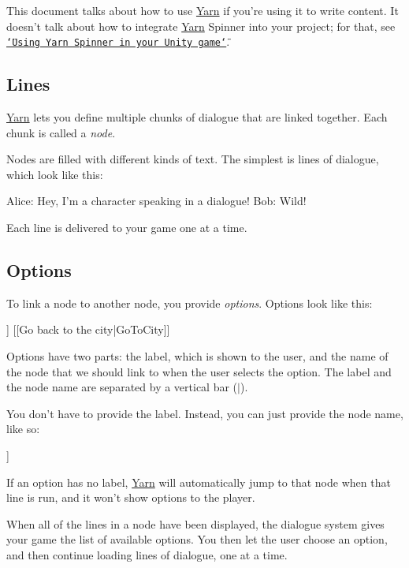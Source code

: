 This document talks about how to use \hyperlink{a00045}{Yarn} if you're using it to write content. It doesn't talk about how to integrate \hyperlink{a00045}{Yarn} Spinner into your project; for that, see \href{../YarnSpinner-Unity}{\tt \char`\"{}\-Using Yarn Spinner in your Unity game\char`\"{}}.

\subsection*{Lines}

\hyperlink{a00045}{Yarn} lets you define multiple chunks of dialogue that are linked together. Each chunk is called a {\itshape node}.

Nodes are filled with different kinds of text. The simplest is lines of dialogue, which look like this\-: \begin{DoxyVerb}Alice: Hey, I'm a character speaking in a dialogue!
Bob: Wild!
\end{DoxyVerb}


Each line is delivered to your game one at a time.

\subsection*{Options}

To link a node to another node, you provide {\itshape options}. Options look like this\-: \begin{DoxyVerb}[[Go to the woods|GoToWoods]]
[[Go back to the city|GoToCity]]
\end{DoxyVerb}


Options have two parts\-: the label, which is shown to the user, and the name of the node that we should link to when the user selects the option. The label and the node name are separated by a vertical bar ({\ttfamily $\vert$}).

You don't have to provide the label. Instead, you can just provide the node name, like so\-: \begin{DoxyVerb}[[GoToCity]]
\end{DoxyVerb}


If an option has no label, \hyperlink{a00045}{Yarn} will automatically jump to that node when that line is run, and it won't show options to the player.

When all of the lines in a node have been displayed, the dialogue system gives your game the list of available options. You then let the user choose an option, and then continue loading lines of dialogue, one at a time.

